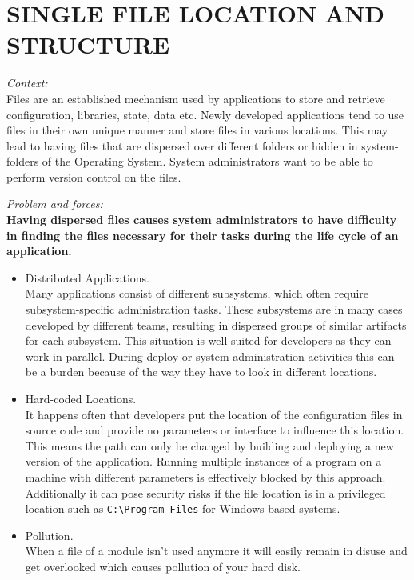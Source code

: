 \newpage
\section*{SINGLE FILE LOCATION AND STRUCTURE}
\textit{Context:}\\
Files are an established mechanism used by applications to store and retrieve configuration, libraries, state, data etc. Newly developed applications tend to use files in their own unique manner and store files in various locations. This may lead to having files that are dispersed over different folders or hidden in system-folders of the Operating System. System administrators  want to be able to perform version control on the files.
\begin{center}
  
\end{center}

\textit{Problem and forces:\\}
\textbf{Having dispersed files causes system administrators to have difficulty in finding the files necessary for their tasks during the life cycle of an application.}\\

\begin{itemize}
\item Distributed Applications.\\
Many applications consist of different subsystems, which often require  subsystem-specific administration tasks. These subsystems are in many cases developed by different teams, resulting in dispersed groups of similar artifacts for each subsystem. This situation is well suited for developers as they can work in parallel. During deploy or system administration activities this can be a burden because of the way they have to look in different locations.
\item Hard-coded Locations.\\
It happens often that developers put the location of the configuration files in source code and provide no parameters or interface to influence this location. This means the path can only be changed by building and deploying a new version of the application. Running multiple instances of a program on a machine with different parameters is effectively blocked by this approach. Additionally it can pose security risks if the file location is in a privileged location such as \verb|C:\Program Files| for Windows based systems.


\item Pollution.\\
When a file of a module isn't used anymore it will easily remain in disuse and get overlooked which causes pollution of your hard disk.\\
\end{itemize}

